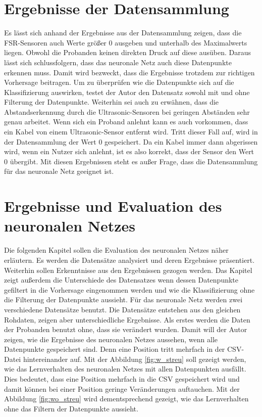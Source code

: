 \section{Ergebnisse der Datensammlung}
\label{sub:res}
Es lässt sich anhand der Ergebnisse aus der Datensammlung zeigen, dass die FSR-Sensoren auch Werte größer 0 ausgeben und unterhalb des Maximalwerts liegen. Obwohl die Probanden keinen direkten Druck auf diese ausüben. Daraus lässt sich schlussfolgern, dass das neuronale Netz auch diese Datenpunkte erkennen muss. Damit wird bezweckt, dass die Ergebnisse trotzdem zur richtigen Vorhersage beitragen. Um zu überprüfen wie die Datenpunkte sich auf die Klassifizierung auswirken, testet der Autor den Datensatz sowohl mit und ohne Filterung der Datenpunkte.
\newline
Weiterhin sei auch zu erwähnen, dass die Abstandserkennung durch die Ultrasonic-Sensoren bei geringen Abständen sehr genau arbeitet. Wenn sich ein Proband anlehnt kann es auch vorkommen, dass ein Kabel von einem Ultrasonic-Sensor entfernt wird. Tritt dieser Fall auf, wird in der Datensammlung der Wert 0 gespeichert. Da ein Kabel immer dann abgerissen wird, wenn ein Nutzer sich anlehnt, ist es also korrekt, dass der Sensor den Wert 0 übergibt. Mit diesen Ergebnissen steht es außer Frage, dass die Datensammlung für das neuronale Netz geeignet ist. 

\section{Ergebnisse und Evaluation des neuronalen Netzes}
\label{subsec:ergeb}
Die folgenden Kapitel sollen die Evaluation des neuronalen Netzes näher erläutern. Es werden die Datensätze analysiert und deren Ergebnisse präsentiert. Weiterhin sollen Erkenntnisse aus den Ergebnissen gezogen werden. Das Kapitel zeigt außerdem die Unterschiede des Datensatzes wenn dessen Datenpunkte gefiltert in die Vorhersage eingenommen werden und wie die Klassifizierung ohne die Filterung der Datenpunkte aussieht.
\newline
Für das neuronale Netz werden zwei verschiedene Datensätze benutzt. Die Datensätze entstehen aus den gleichen Rohdaten, zeigen aber unterschiedliche Ergebnisse. Als erstes werden die Daten der Probanden benutzt ohne, dass sie verändert wurden. Damit will der Autor zeigen, wie die Ergebnisse des neuronalen Netzes aussehen, wenn alle Datenpunkte gespeichert sind. Denn eine Position tritt mehrfach in der CSV-Datei hintereinander auf. Mit der Abbildung \ref{fig:w_streu} soll gezeigt werden, wie das Lernverhalten des neuronalen Netzes mit allen Datenpunkten ausfällt. Dies bedeutet, dass eine Position mehrfach in die CSV gespeichert wird und damit können bei einer Position geringe Veränderungen auftauchen. Mit der Abbildung \ref{fig:wo_streu} wird dementsprechend gezeigt, wie das Lernverhalten ohne das Filtern der Datenpunkte aussieht.

